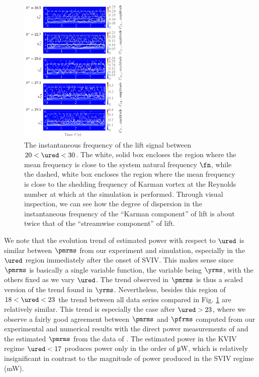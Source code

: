 \documentclass[a4paper,fleqn]{cas-sc}
\begin{document}
\begin{figure}
  \centering
  \includegraphics[width=0.47\textwidth]{figs/figure21}
  \caption{The instantaneous frequency of the lift signal between $20 < \ured < 30$. The white, solid box encloses the region where the mean frequency is close to the system natural frequency $\fn$, while the dashed, white box encloses the region where the mean frequency is close to the shedding frequency of Karman vortex at the Reynolds number at which at the simulation is performed. Through visual inspection, we can see how the degree of dispersion in the instantaneous frequency of the ``Karman component'' of lift is about twice that of the ``streamwise component'' of lift.}
  \label{fig:instantLiftFreq}
\end{figure}

We note that the evolution trend of estimated power with respect to $\ured$ is similar between $\pmrms$ from our experiment and simulation, especially in the $\ured$ region immediately after the onset of SVIV. This makes sense since $\pmrms$ is basically a single variable function, the variable being $\yrms$, with the others fixed as we vary $\ured$. The trend observed in $\pmrms$ is thus a scaled version of the trend found in $\yrms$. Nevertheless, besides this region of $18 < \ured < 23$ the trend between all data series compared in Fig. \ref{fig:instantLiftFreq} are relatively similar. This trend is especially the case after $\ured > 23$, where we observe a fairly good agreement between $\pmrms$ and $\pfrms$ computed from our experimental and numerical results with the direct power measurements of \citet{Koide2013} and the estimated $\pmrms$ from the data of \citet{Nguyen2012}. The estimated power in the KVIV regime $\ured < 17$ produces power only in the order of \si{\micro\watt}, which is relatively insignificant in contrast to the magnitude of power produced in the SVIV regime (mW).
\end{document}
